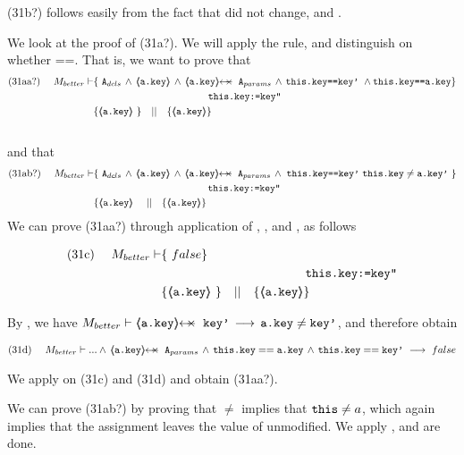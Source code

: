 \begin{proofO}
(31b?) follows easily from  the fact that  did not change, and  {}.

\vspace{.5cm}
We look at the proof of (31a?).  We will apply the {} rule, and distinguish on whether ==. That is, we want to prove that\\
\small{
\begin{align*}
\text{(31aa?)}  \ \ \ \ M_{better} \vdash 
		&	\{  \ \Alocals\,\wedge\, {\inside{\prg{a.key}}} \, \wedge \, \protectedFrom {\prg{a.key}} {\Aparams} \, \wedge  \,  \prg{this.key==key'}\ \wedge \prg{this.key==a.key}  \} \\
			& \SPT \SPT   \SPT\SPT  \prg{this.key:=key''} \\
	       	& \{ {\inside{\prg{a.key}}}\   \} \ \ \  || \ \ \ 
		   \{ {\inside{\prg{a.key}}} \}
\end{align*}
}
\\
and that
\\
\small{
\begin{align*}
\text{(31ab?)}  \ \ \ \ M_{better} \vdash 
		&	\{  \ \Alocals\,\wedge\, {\inside{\prg{a.key}}} \, \wedge \, \protectedFrom {\prg{a.key}} {\Aparams} \, \wedge  \,   \,  \prg{this.key==key'}\   \prg{this.key}\neq\prg{a.key'}\  \} \\
		& \SPT \SPT   \SPT\SPT  \prg{this.key:=key''} \\
		& \{ {\inside{\prg{a.key}}}\   \ \ \  || \ \ \ 
		   \{ {\inside{\prg{a.key}}} \}
\end{align*}
}
\vspace{.2cm}
We can prove (31aa?) through application of {}, {}, and {}, as follows

\begin{align*}
\text{(31c)}  \ \ \ \ M_{better} \vdash 
		&	\{  \ false  \} \\
		& \SPT \SPT   \SPT\SPT  \prg{this.key:=key''} \\
		& \{ {\inside{\prg{a.key}}}\   \} \ \ \  || \ \ \ 
		   \{ {\inside{\prg{a.key}}} \}
\end{align*}

By  {}, we have $M_{better} \vdash  \protectedFrom {\prg{a.key}} {\prg{key'}} \, \longrightarrow\, {\prg{a.key}}\neq {\prg{key'}}$, and therefore obtain

\begin{align*}
\text{(31d)}  \ \ \ \ M_{better} \vdash  ... \wedge \, \protectedFrom {\prg{a.key}} {\Aparams} \, \wedge  \, \prg{this.key}==\prg{a.key}\, \wedge\,  \prg{this.key}==\prg{key'}\ \longrightarrow \ false 
\end{align*}

We apply  {\sc{Consequ}} on (31c) and (31d) and obtain (31aa?).

\vspace{.5cm}
We can prove (31ab?) by proving that \prg{this.key}$\neq$ implies that $\mbox{\normalfont{\texttt{this}}}\neq a$, which again implies that the assignment  leaves the value of  unmodified. We apply {}, and are done.

\end{proofO} 

